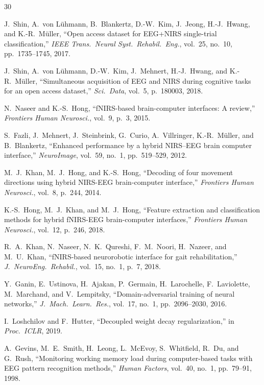 \documentclass[conference]{IEEEtran}
\begin{document}
\begin{thebibliography}{30}

J.~Shin, A.~von L\"uhmann, B.~Blankertz, D.-W.~Kim, J.~Jeong, H.-J.~Hwang, and K.-R.~M\"uller, ``Open access dataset for EEG+NIRS single-trial classification,'' \emph{IEEE Trans.\ Neural Syst.\ Rehabil.\ Eng.}, vol.~25, no.~10, pp.~1735--1745, 2017.

J.~Shin, A.~von L\"uhmann, D.-W.~Kim, J.~Mehnert, H.-J.~Hwang, and K.-R.~M\"uller, ``Simultaneous acquisition of EEG and NIRS during cognitive tasks for an open access dataset,'' \emph{Sci.\ Data}, vol.~5, p.~180003, 2018.

N.~Naseer and K.-S.~Hong, ``fNIRS-based brain-computer interfaces: A review,'' \emph{Frontiers Human Neurosci.}, vol.~9, p.~3, 2015.

S.~Fazli, J.~Mehnert, J.~Steinbrink, G.~Curio, A.~Villringer, K.-R.~M\"uller, and B.~Blankertz, ``Enhanced performance by a hybrid NIRS--EEG brain computer interface,'' \emph{NeuroImage}, vol.~59, no.~1, pp.~519--529, 2012.

M.~J.~Khan, M.~J.~Hong, and K.-S.~Hong, ``Decoding of four movement directions using hybrid NIRS-EEG brain-computer interface,'' \emph{Frontiers Human Neurosci.}, vol.~8, p.~244, 2014.

K.-S.~Hong, M.~J.~Khan, and M.~J.~Hong, ``Feature extraction and classification methods for hybrid fNIRS-EEG brain-computer interfaces,'' \emph{Frontiers Human Neurosci.}, vol.~12, p.~246, 2018.

R.~A.~Khan, N.~Naseer, N.~K.~Qureshi, F.~M.~Noori, H.~Nazeer, and M.~U.~Khan, ``fNIRS-based neurorobotic interface for gait rehabilitation,'' \emph{J.\ NeuroEng.\ Rehabil.}, vol.~15, no.~1, p.~7, 2018.

Y.~Ganin, E.~Ustinova, H.~Ajakan, P.~Germain, H.~Larochelle, F.~Laviolette, M.~Marchand, and V.~Lempitsky, ``Domain-adversarial training of neural networks,'' \emph{J.\ Mach.\ Learn.\ Res.}, vol.~17, no.~1, pp.~2096--2030, 2016.

I.~Loshchilov and F.~Hutter, ``Decoupled weight decay regularization,'' in \emph{Proc.\ ICLR}, 2019.

A.~Gevins, M.~E.~Smith, H.~Leong, L.~McEvoy, S.~Whitfield, R.~Du, and G.~Rush, ``Monitoring working memory load during computer-based tasks with EEG pattern recognition methods,'' \emph{Human Factors}, vol.~40, no.~1, pp.~79--91, 1998.


\end{thebibliography}
\end{document}
